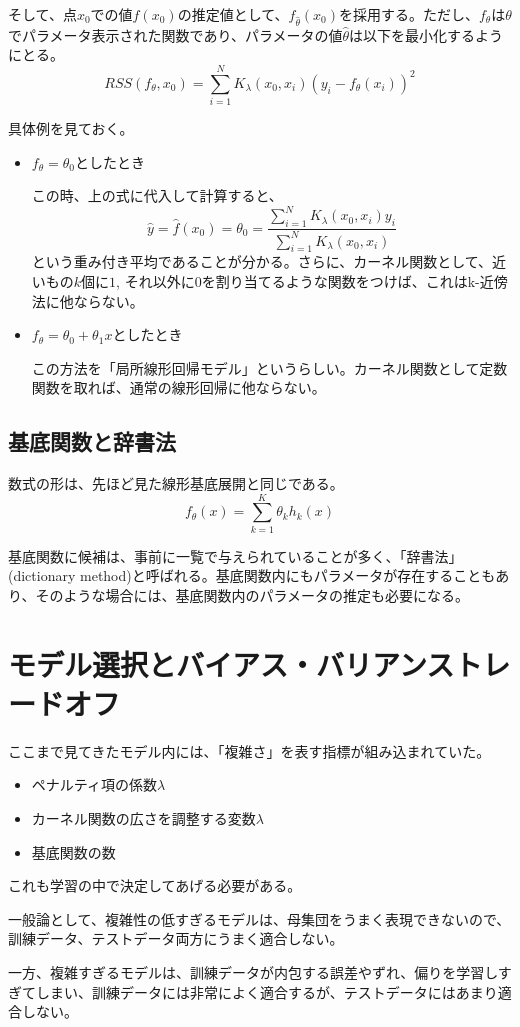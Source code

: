 \documentclass[uplatex]{jsarticle}
\begin{document}
そして、点$x_0$での値$f(x_0)$の推定値として、$f_{\hat{\theta}}(x_0)$を採用する。ただし、$f_{\theta}$は$\theta$でパラメータ表示された関数であり、パラメータの値$\hat{\theta}$は以下を最小化するようにとる。
\[
  RSS(f_\theta,x_0)=\sum_{i=1}^NK_\lambda(x_0,x_i)(y_i-f_\theta(x_i))^2
\]

具体例を見ておく。
\begin{itemize}
  \item $f_\theta=\theta_0$としたとき

  この時、上の式に代入して計算すると、
  \[
    \hat{y}=\hat{f}(x_0)=\theta_0=\frac{\sum_{i=1}^NK_\lambda(x_0,x_i)y_i}{\sum_{i=1}^NK_\lambda(x_0,x_i)}
  \]
  という重み付き平均であることが分かる。さらに、カーネル関数として、近いもの$k$個に$1$, それ以外に$0$を割り当てるような関数をつけば、これはk-近傍法に他ならない。
  \item $f_\theta=\theta_0+\theta_1x$としたとき

  この方法を「局所線形回帰モデル」というらしい。カーネル関数として定数関数を取れば、通常の線形回帰に他ならない。
\end{itemize}
\subsection{基底関数と辞書法}
数式の形は、先ほど見た線形基底展開と同じである。
\[
  f_\theta(x) = \sum_{k=1}^K\theta_kh_k(x)
\]

基底関数に候補は、事前に一覧で与えられていることが多く、「辞書法」(dictionary method)と呼ばれる。基底関数内にもパラメータが存在することもあり、そのような場合には、基底関数内のパラメータの推定も必要になる。

\section{モデル選択とバイアス・バリアンストレードオフ}
ここまで見てきたモデル内には、「複雑さ」を表す指標が組み込まれていた。
\begin{itemize}
  \item ペナルティ項の係数$\lambda$
  \item カーネル関数の広さを調整する変数$\lambda$
  \item 基底関数の数
\end{itemize}
これも学習の中で決定してあげる必要がある。

一般論として、複雑性の低すぎるモデルは、母集団をうまく表現できないので、訓練データ、テストデータ両方にうまく適合しない。

一方、複雑すぎるモデルは、訓練データが内包する誤差やずれ、偏りを学習しすぎてしまい、訓練データには非常によく適合するが、テストデータにはあまり適合しない。
\end{document}

